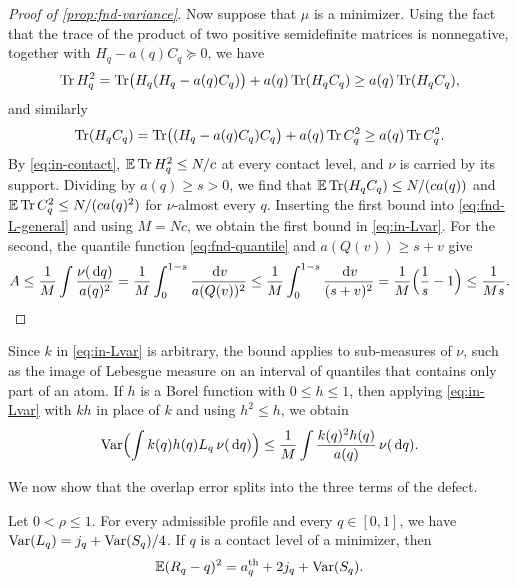 \begin{proof}[Proof of \cref{prop:fnd-variance}]
Now suppose that $\mu$ is a minimizer. Using the fact that the trace of
the product of two positive semidefinite matrices is nonnegative,
together with
$H_q-a(q)C_q\succeq0$, we have
\[
 \operatorname{Tr} H_q^2=\operatorname{Tr}\bigl(H_q(H_q-a(q)C_q)\bigr)+a(q)\operatorname{Tr}(H_qC_q)
 \ge a(q)\operatorname{Tr}(H_qC_q),
\]
and similarly
\[
 \operatorname{Tr}(H_qC_q)=\operatorname{Tr}\bigl((H_q-a(q)C_q)C_q\bigr)+a(q)\operatorname{Tr} C_q^2
 \ge a(q)\operatorname{Tr} C_q^2 .
\]
By \eqref{eq:in-contact}, $\mathbb E\operatorname{Tr} H_q^2\le N/c$ at every contact level,
and $\nu$ is carried by its support. Dividing by $a(q)\ge s>0$, we find that
$\mathbb E\operatorname{Tr}(H_qC_q)\le N/(ca(q))$ and $\mathbb E\operatorname{Tr} C_q^2\le N/(ca(q)^2)$ for
$\nu$-almost every $q$. Inserting the first bound into
\eqref{eq:fnd-L-general} and using $M=Nc$, we obtain the first bound in
\eqref{eq:in-Lvar}. For the second, the quantile function
\eqref{eq:fnd-quantile} and $a(Q(v))\ge s+v$ give
\[
 A\le\frac1M\int\frac{\nu(\,\mathrm d q)}{a(q)^2}
  =\frac1M\int_0^{1-s}\frac{\,\mathrm d v}{a(Q(v))^2}
  \le\frac1M\int_0^{1-s}\frac{\,\mathrm d v}{(s+v)^2}
  =\frac1M\Bigl(\frac1s-1\Bigr)\le\frac1{Ms}. \qedhere
\]
\end{proof}

\begin{remark}\label{rem:fnd-partial-atoms}
Since $k$ in \eqref{eq:in-Lvar} is arbitrary, the bound applies to
sub-measures of $\nu$, such as the image of Lebesgue measure on an
interval of quantiles that contains only part of an atom. If $h$ is a
Borel function with $0\le h\le1$, then applying \eqref{eq:in-Lvar} with
$kh$ in place of $k$ and using $h^2\le h$, we obtain
\[
 \operatorname{Var}\Bigl(\int k(q)h(q)L_q\,\nu(\,\mathrm d q)\Bigr)
 \le\frac1M\int\frac{k(q)^2h(q)}{a(q)}\,\nu(\,\mathrm d q).
\]
\end{remark}

We now show that the overlap error splits into the three terms of the
defect.

\begin{lemma}\label{lem:fnd-decomp}
Let $0<\rho\le1$. For every admissible profile and every $q\in[0,1]$, we
have $\operatorname{Var}(L_q)=j_q+\operatorname{Var}(S_q)/4$. If $q$ is a contact level of a
minimizer, then
\begin{equation}\label{eq:in-decomp}
 \mathbb E(R_q-q)^2=a_q^{\rm th}+2j_q+\operatorname{Var}(S_q).
\end{equation}
\end{lemma}

